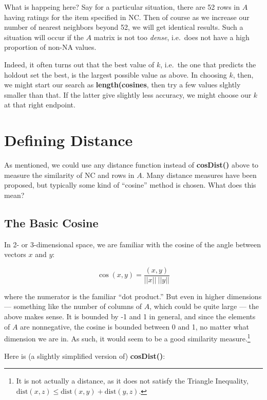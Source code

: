 What is happeing here?  Say for a particular situation, there are 52
rows in $A$ having ratings for the item specified in NC.  Then of course
as we increase our number of nearest neighbors beyond 52, we will get
identical results.  Such a situation will occur if the $A$ matrix is not
too \textit{dense}, i.e.\ does not have a high proportion of non-NA
values.  

Indeed, it often turns out that the best value of $k$, i.e.\ the one
that predicts the holdout set the best, is the largest possible value as
above.  In choosing $k$, then, we might start our search as
\textbf{length(cosines}, then try a few values slghtly smaller than
that.  If the latter give slightly less accuracy, we might choose our
$k$ at that right endpoint.

\section{Defining Distance}

As mentioned, we could use any distance function instead of
\textbf{cosDist()} above to measure the similarity of NC and rows in
$A$.  Many distance measures have been proposed, but typically some kind
of ``cosine'' method is chosen.  What does this mean?

\subsection{The Basic Cosine}

In 2- or 3-dimensional space, we are familiar with the cosine of the
angle between vectors $x$ and $y$:

\begin{equation}
\cos(x,y) = \frac{(x,y)}{||x|| ~ ||y||}
\end{equation}

where the numerator is the familiar ``dot product.''  But even in higher
dimensions --- something like the number of columns of $A$, which could
be quite large --- the above makes sense.  It is bounded by -1 and 1 in
general, and since the elements of $A$ are nonnegative, the cosine is
bounded between 0 and 1, no matter what dimension we are in.
As such, it would seem to be a good similarity measure.\footnote{It is
not actually a distance, as it does not satisfy the Triangle Inequality,
$\textrm{dist}(x,z) \leq \textrm{dist}(x,y) + \textrm{dist}(y,z)$.}

Here is (a slightly simplified version of) \textbf{cosDist()}:

